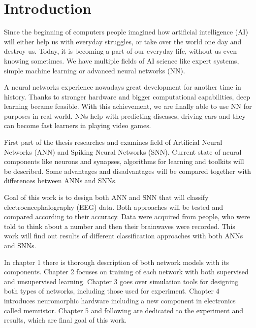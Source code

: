 \chapter*{Introduction}

Since the beginning of computers people imagined how artificial intelligence (AI) will either help us with everyday struggles, or take over the world one day and destroy us. Today, it is becoming a part of our everyday life, without us even knowing sometimes. We have multiple fields of AI science like expert systems, simple machine learning or advanced neural networks (NN).

A neural networks experience nowadays great development for another time in history. Thanks to stronger hardware and bigger computational capabilities, deep learning became feasible. With this achievement, we are finally able to use NN for purposes in real world. NNs help with predicting diseases, driving cars and they can become fast learners in playing video games.

First part of the thesis researches and examines field of Artificial Neural Networks (ANN) and Spiking Neural Networks (SNN). Current state of neural components like neurons and synapses, algorithms for learning and toolkits will be described. Some advantages and disadvantages will be compared together with differences between ANNs and SNNs.

Goal of this work is to design both ANN and SNN that will classify electroencephalography (EEG) data. Both approaches will be tested and compared according to their accuracy. Data were acquired from people, who were told to think about a number and then their brainwaves were recorded. This work will find out results of different classification approaches with both ANNs and SNNs.

In chapter 1 there is thorough description of both network models with its components. Chapter 2 focuses on training of each network with both supervised and unsupervised learning. Chapter 3 goes over simulation tools for designing both types of networks, including those used for experiment. Chapter 4 introduces neuromorphic hardware including a new component in electronics called memristor. Chapter 5 and following are dedicated to the experiment and results, which are final goal of this work.

